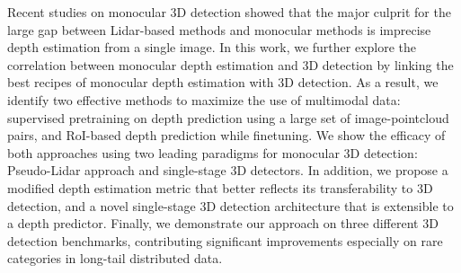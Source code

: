 

Recent studies on monocular 3D detection showed that the major culprit for the large gap between Lidar-based methods and monocular methods is imprecise depth estimation from a single image. In this work, we further explore the correlation between monocular depth estimation and 3D detection by linking the best recipes of monocular depth estimation with 3D detection. As a result, we identify two effective methods to maximize the use of multimodal data: supervised pretraining on depth prediction using a large set of image-pointcloud pairs, and RoI-based depth prediction while finetuning. We show the efficacy of both approaches using two leading paradigms for monocular 3D detection: Pseudo-Lidar approach and single-stage 3D detectors. In addition, we propose a modified depth estimation metric that better reflects its transferability to 3D detection, and a novel single-stage 3D detection architecture that is extensible to a depth predictor. Finally, we demonstrate our approach on three different 3D detection benchmarks, contributing significant improvements especially on rare categories in long-tail distributed data.

